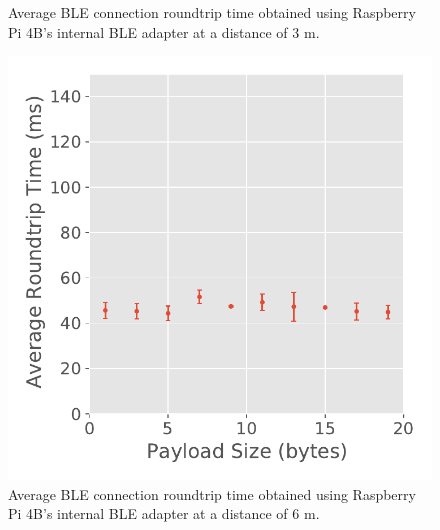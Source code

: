 \begin{figure}[H]
\begin{minipage}{0.45\linewidth}
        \caption[Average \acs{BLE} connection roundtrip time obtained using the Raspberry Pi 4B's internal \acs{BLE} adapter at a distance of 3 m.]{Average \acs{BLE} connection roundtrip time obtained using Raspberry Pi 4B's internal \acs{BLE} adapter at a distance of $3\text{ m}$.}
        \label{fig:ble-roundtrip-hci1-3m}
    \end{minipage}
\end{figure}

\begin{figure}[H]
    \centering
    \begin{minipage}{0.45\linewidth}
        \centering
        \includegraphics[width=\linewidth]{images/ble-roundtrip-hci1-600cm.pdf}
        \caption[Average \acs{BLE} connection roundtrip time obtained using the Raspberry Pi 4B's internal \acs{BLE} adapter at a distance of 6 m.]{Average \acs{BLE} connection roundtrip time obtained using Raspberry Pi 4B's internal \acs{BLE} adapter at a distance of $6\text{ m}$.}
        \label{fig:ble-roundtrip-hci1-6m}
    \end{minipage}
    \hspace{0.05\linewidth}
    \begin{minipage}{0.45\linewidth}
        \centering

\end{minipage}
\end{figure}
